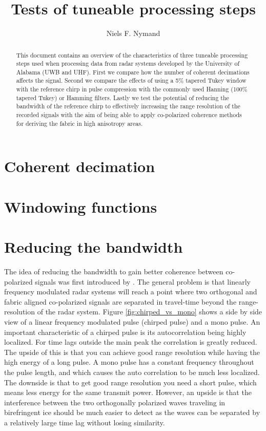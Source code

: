 \documentclass[]{article}
\title{Tests of tuneable processing steps}
\author{Niels F. Nymand}
\begin{document}
\maketitle

\begin{abstract}
	This document contains an overview of the characteristics of three tuneable processing steps used when processing data from radar systems developed by the University of Alabama (UWB and UHF). First we compare how the number of coherent decimations affects the signal. Second we compare the effects of using a 5\% tapered Tukey window with the reference chirp in pulse compression with the commonly used Hanning (100\% tapered Tukey) or Hamming filters. Lastly we test the potential of reducing the bandwidth of the reference chirp to effectively increasing the range resolution of the recorded signals with the aim of being able to apply co-polarized coherence methods for deriving the fabric in high anisotropy areas.
\end{abstract}


\section{Coherent decimation}

\section{Windowing functions}

\section{Reducing the bandwidth}
The idea of reducing the bandwidth to gain better coherence between co-polarized signals was first introduced by \cite{zeising_brief_2024}. The general problem is that linearly frequency modulated radar systems will reach a point where two orthogonal and fabric aligned co-polarized signals are separated in travel-time beyond the range-resolution of the radar system. 
Figure \ref{fig:chirped_vs_mono} shows a side by side view of a linear frequency modulated pulse (chirped pulse) and a mono pulse. An important characteristic of a chirped pulse is its autocorrelation being highly localized. For time lags outside the main peak the correlation is greatly reduced. The upside of this is that you can achieve good range resolution while having the high energy of a long pulse. A mono pulse has a constant frequency throughout the pulse length, and which causes the auto correlation to be much less localized. The downside is that to get good range resolution you need a short pulse, which means less energy for the same transmit power. However, an upside is that the interference between the two orthogonally polarized waves traveling in birefringent ice should be much easier to detect as the waves can be separated by a relatively large time lag without losing similarity.
\end{document}
